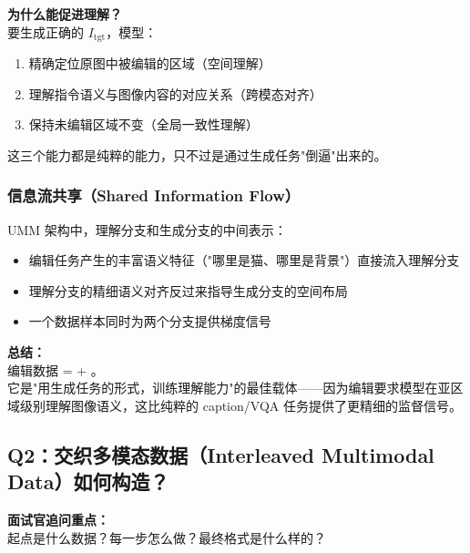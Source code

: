 \begin{intubox}
\textbf{为什么能促进理解？}\\
要生成正确的 $I_\text{tgt}$，模型：
\begin{enumerate}
  \item 精确定位原图中被编辑的区域（空间理解）
  \item 理解指令语义与图像内容的对应关系（跨模态对齐）
  \item 保持未编辑区域不变（全局一致性理解）
\end{enumerate}
这三个能力都是纯粹的能力，只不过是通过生成任务"倒逼"出来的。
\end{intubox}

\subsubsection{信息流共享（Shared Information Flow）}

UMM 架构中，理解分支和生成分支的中间表示：

\begin{itemize}[leftmargin=1.5em]
  \item 编辑任务产生的丰富语义特征（"哪里是猫、哪里是背景"）直接流入理解分支
  \item 理解分支的精细语义对齐反过来指导生成分支的空间布局
  \item 一个数据样本同时为两个分支提供梯度信号
\end{itemize}

\begin{summarybox}
\textbf{总结：}\\
编辑数据 =  + 。\\
它是"用生成任务的形式，训练理解能力"的最佳载体——因为编辑要求模型在亚区域级别理解图像语义，这比纯粹的 caption/VQA 任务提供了更精细的监督信号。
\end{summarybox}

\subsection{Q2：交织多模态数据（Interleaved Multimodal Data）如何构造？}

\begin{warnbox}
\textbf{面试官追问重点：}\\
起点是什么数据？每一步怎么做？最终格式是什么样的？
\end{warnbox}

